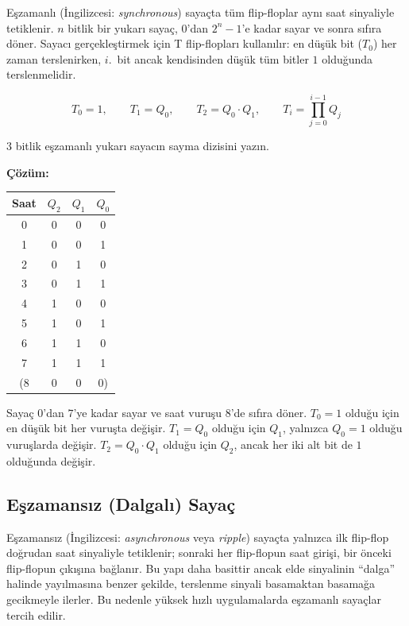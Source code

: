 Eşzamanlı (İngilizcesi: \textit{synchronous}) sayaçta tüm flip-floplar aynı saat sinyaliyle tetiklenir. $n$ bitlik bir yukarı sayaç, $0$'dan $2^n - 1$'e kadar sayar ve sonra sıfıra döner. Sayacı gerçekleştirmek için T flip-flopları kullanılır: en düşük bit ($T_0$) her zaman terslenirken, $i$.~bit ancak kendisinden düşük tüm bitler $1$ olduğunda terslenmelidir.

\[
T_0 = 1, \qquad T_1 = Q_0, \qquad T_2 = Q_0 \cdot Q_1, \qquad T_i = \prod_{j=0}^{i-1} Q_j
\]

\begin{ornek}[B.6]
3 bitlik eşzamanlı yukarı sayacın sayma dizisini yazın.

\textbf{Çözüm:}

\begin{table}[H]
\centering
\begin{tabular}{c|ccc}
\toprule
\textbf{Saat} & $Q_2$ & $Q_1$ & $Q_0$ \\
\midrule
0 & 0 & 0 & 0 \\
1 & 0 & 0 & 1 \\
2 & 0 & 1 & 0 \\
3 & 0 & 1 & 1 \\
4 & 1 & 0 & 0 \\
5 & 1 & 0 & 1 \\
6 & 1 & 1 & 0 \\
7 & 1 & 1 & 1 \\
(8 & 0 & 0 & 0) \\
\bottomrule
\end{tabular}
\end{table}

Sayaç $0$'dan $7$'ye kadar sayar ve saat vuruşu 8'de sıfıra döner. $T_0 = 1$ olduğu için en düşük bit her vuruşta değişir. $T_1 = Q_0$ olduğu için $Q_1$, yalnızca $Q_0 = 1$ olduğu vuruşlarda değişir. $T_2 = Q_0 \cdot Q_1$ olduğu için $Q_2$, ancak her iki alt bit de $1$ olduğunda değişir.
\end{ornek}

\subsection{Eşzamansız (Dalgalı) Sayaç}

Eşzamansız (İngilizcesi: \textit{asynchronous} veya \textit{ripple}) sayaçta yalnızca ilk flip-flop doğrudan saat sinyaliyle tetiklenir; sonraki her flip-flopun saat girişi, bir önceki flip-flopun çıkışına bağlanır. Bu yapı daha basittir ancak elde sinyalinin ``dalga'' halinde yayılmasına benzer şekilde, terslenme sinyali basamaktan basamağa gecikmeyle ilerler. Bu nedenle yüksek hızlı uygulamalarda eşzamanlı sayaçlar tercih edilir.


